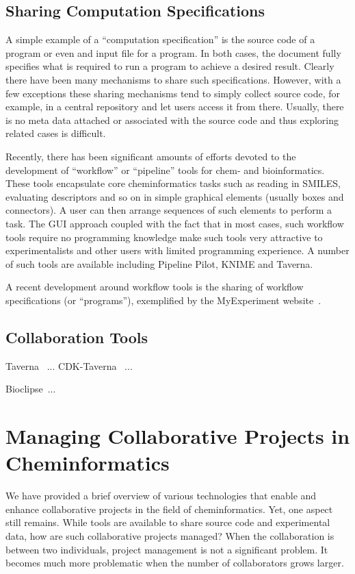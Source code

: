 \documentclass[12pt]{book}
\begin{document}
\subsection{Sharing Computation Specifications}

A simple example of a ``computation specification'' is the source code
of a program or even and input file for a program. In both cases, the
document fully specifies what is required to run a program to achieve
a desired result. Clearly there have been many mechanisms to share
such specifications. However, with a few exceptions these sharing
mechanisms tend to simply collect source code, for example, in a
central repository and let users access it from there. Usually, there
is no meta data attached or associated with the source code and thus
exploring related cases is difficult.

Recently, there has been significant amounts of efforts devoted to the
development of ``workflow'' or ``pipeline'' tools for chem- and
bioinformatics. These tools encapsulate core cheminformatics tasks
such as reading in SMILES, evaluating descriptors and so on in simple
graphical elements (usually boxes and connectors). A user can then
arrange sequences of such elements to perform a task. The GUI approach
coupled with the fact that in most cases, such workflow tools require
no programming knowledge make such tools very attractive to
experimentalists and other users with limited programming
experience. A number of such tools are available including Pipeline
Pilot, KNIME and Taverna.

A recent development around workflow tools is the sharing of workflow
specifications (or ``programs''), exemplified by the MyExperiment
website~\cite{Goble2010}.


\subsection{Collaboration Tools}

Taverna~\cite{Oinn2004} ... CDK-Taverna~\cite{Kuhn2010} ...

Bioclipse~\cite{Spjuth2009,Spjuth2007}...

\section{Managing Collaborative Projects in Cheminformatics}

We have provided a brief overview of various technologies that enable
and enhance collaborative projects in the field of
cheminformatics. Yet, one aspect still remains. While tools are
available to share source code and experimental data, how are such
collaborative projects managed? When the collaboration is between two
individuals, project management is not a significant problem. It
becomes much more problematic when the number of collaborators grows
larger.
\end{document}
